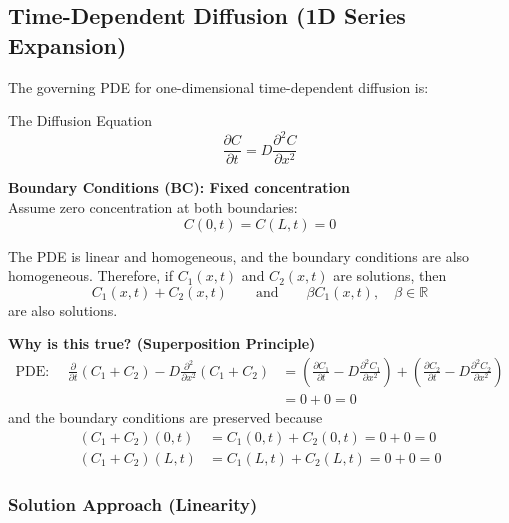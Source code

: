 \subsection{Time-Dependent Diffusion (1D Series Expansion)}

The governing PDE for one-dimensional time-dependent diffusion is:

\begin{defbox}{The Diffusion Equation}
\begin{equation}
    \frac{\partial C}{\partial t}=D\frac{\partial^2 C}{\partial x^2}
\end{equation}
\end{defbox}

\noindent \textbf{Boundary Conditions (BC): Fixed concentration} \\
Assume zero concentration at both boundaries:
\begin{equation}
    C(0,t)=C(L,t)=0
\end{equation}

\begin{notebox}
The PDE is linear and homogeneous, and the boundary conditions are also homogeneous. Therefore, if $C_1(x,t)$ and $C_2(x,t)$ are solutions, then
\begin{equation*}
    C_1(x,t)+C_2(x,t)
    \qquad \text{and} \qquad
    \beta C_1(x,t), \quad \beta\in\mathbb{R}
\end{equation*}
are also solutions.
\end{notebox}

\noindent \textbf{Why is this true? (Superposition Principle)}
\begin{align*}
    \text{PDE: } \quad
    \frac{\partial}{\partial t}(C_1+C_2)-D\frac{\partial^2}{\partial x^2}(C_1+C_2)
    &=
    \left(\frac{\partial C_1}{\partial t}-D\frac{\partial^2 C_1}{\partial x^2}\right)
    +
    \left(\frac{\partial C_2}{\partial t}-D\frac{\partial^2 C_2}{\partial x^2}\right) \\
    &=0+0=0
\end{align*}
and the boundary conditions are preserved because
\begin{align*}
    (C_1+C_2)(0,t) &= C_1(0,t)+C_2(0,t)=0+0=0 \\
    (C_1+C_2)(L,t) &= C_1(L,t)+C_2(L,t)=0+0=0
\end{align*}

\subsubsection{Solution Approach (Linearity)}

